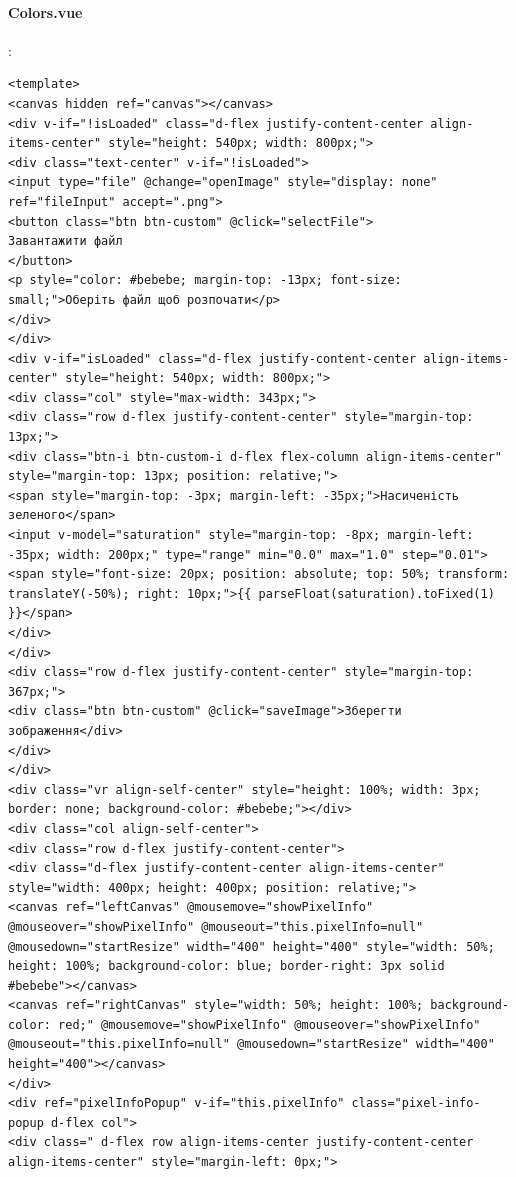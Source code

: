\documentclass[oneside,14pt]{extarticle}
\begin{document}
\begin{normalsize}
		\paragraph{Colors.vue}
		:
		\begin{tiny}
		\begin{lstlisting}
<template>
<canvas hidden ref="canvas"></canvas>
<div v-if="!isLoaded" class="d-flex justify-content-center align-items-center" style="height: 540px; width: 800px;">
<div class="text-center" v-if="!isLoaded">
<input type="file" @change="openImage" style="display: none" ref="fileInput" accept=".png">
<button class="btn btn-custom" @click="selectFile">
Завантажити файл
</button>
<p style="color: #bebebe; margin-top: -13px; font-size: small;">Оберіть файл щоб розпочати</p>
</div>
</div>
<div v-if="isLoaded" class="d-flex justify-content-center align-items-center" style="height: 540px; width: 800px;">
<div class="col" style="max-width: 343px;">
<div class="row d-flex justify-content-center" style="margin-top: 13px;">
<div class="btn-i btn-custom-i d-flex flex-column align-items-center" style="margin-top: 13px; position: relative;">
<span style="margin-top: -3px; margin-left: -35px;">Насиченість зеленого</span>
<input v-model="saturation" style="margin-top: -8px; margin-left: -35px; width: 200px;" type="range" min="0.0" max="1.0" step="0.01">
<span style="font-size: 20px; position: absolute; top: 50%; transform: translateY(-50%); right: 10px;">{{ parseFloat(saturation).toFixed(1) }}</span>
</div>
</div>
<div class="row d-flex justify-content-center" style="margin-top: 367px;">
<div class="btn btn-custom" @click="saveImage">Зберегти зображення</div>
</div>
</div>
<div class="vr align-self-center" style="height: 100%; width: 3px; border: none; background-color: #bebebe;"></div>
<div class="col align-self-center">
<div class="row d-flex justify-content-center">
<div class="d-flex justify-content-center align-items-center" style="width: 400px; height: 400px; position: relative;">
<canvas ref="leftCanvas" @mousemove="showPixelInfo" @mouseover="showPixelInfo" @mouseout="this.pixelInfo=null" @mousedown="startResize" width="400" height="400" style="width: 50%; height: 100%; background-color: blue; border-right: 3px solid #bebebe"></canvas>
<canvas ref="rightCanvas" style="width: 50%; height: 100%; background-color: red;" @mousemove="showPixelInfo" @mouseover="showPixelInfo" @mouseout="this.pixelInfo=null" @mousedown="startResize" width="400" height="400"></canvas>
</div>
<div ref="pixelInfoPopup" v-if="this.pixelInfo" class="pixel-info-popup d-flex col">
<div class=" d-flex row align-items-center justify-content-center align-items-center" style="margin-left: 0px;">

\end{lstlisting}
\end{tiny}
\end{normalsize}
\end{document}
